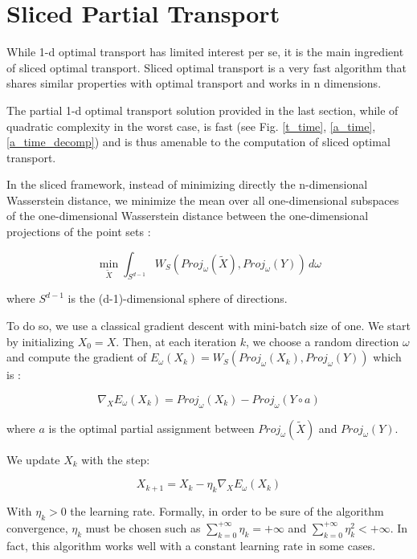 \documentclass[a4paper,12pt]{article}
\begin{document}
\section{Sliced Partial Transport}

While 1-d optimal transport has limited interest per se, it is the main ingredient of sliced optimal transport. Sliced optimal transport is a very fast algorithm that shares similar properties with optimal transport and works in n dimensions.

The partial 1-d optimal transport solution provided in the last section, while of quadratic complexity in the worst case, is fast (see Fig. \ref{t_time}, \ref{a_time}, \ref{a_time_decomp}) and is thus amenable to the computation of sliced optimal transport.

In the sliced framework, instead of minimizing directly the n-dimensional Wasserstein distance, we minimize the mean over all one-dimensional subspaces of the one-dimensional Wasserstein distance between the one-dimensional projections of the point sets :

\begin{equation}
\min_{\tilde{X}} \int_{S^{d-1}} W_S(Proj_\omega(\tilde{X}),Proj_\omega(Y))\,d\omega
\end{equation}

\noindent where $S^{d−1}$ is the (d-1)-dimensional sphere of directions.

To do so, we use a classical gradient descent with mini-batch size of one. We start by initializing $X_0 = X$. Then, at each iteration $k$, we choose a random direction $\omega$ and compute the gradient of $E_\omega(X_k) = W_S(Proj_\omega(X_k),Proj_\omega(Y))$ which is :

\begin{equation}
\nabla_{X}  E_\omega(X_k) = Proj_\omega(X_k)-Proj_\omega(Y \circ a)
\end{equation}

\noindent where $a$ is the optimal partial assignment between $Proj_\omega(\tilde{X})$ and $Proj_\omega(Y)$. 

We update $X_k$ with the step:

$$
X_{k+1} = X_k - \eta_k \nabla_{X}  E_\omega(X_k)
$$

\noindent With $\eta_k>0$ the learning rate. Formally, in order to be sure of the algorithm convergence, $\eta_k$ must be chosen such as $\sum_{k=0}^{+\infty} \eta_k = +\infty$ and $\sum_{k=0}^{+\infty} \eta_k^2 < +\infty$. In fact, this algorithm works well with a constant learning rate in some cases.
\end{document}
